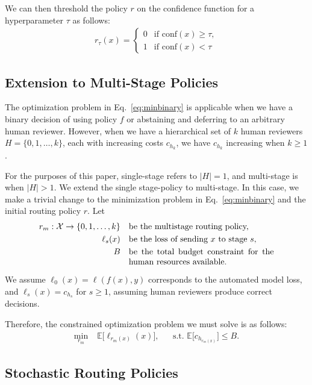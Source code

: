 \documentclass[conference]{IEEEtran}
\begin{document}
We can then threshold the policy $r$ on the confidence function for a hyperparameter 
$\tau$ as follows:
\begin{align}
r_\tau(x) =
\begin{cases} 
0 & \text{if } \mathrm{conf}(x) \geq \tau, \\
1 & \text{if } \mathrm{conf}(x) < \tau
\end{cases}
\end{align}

\subsection{Extension to Multi-Stage Policies}

The optimization problem in Eq.~\eqref{eq:minbinary} is applicable when we have a binary decision of
using policy $f$ or abstaining and deferring to an arbitrary human reviewer. However, when we have a 
hierarchical set of $k$ human reviewers $H = \{0,1, \dots ,k\}$, each with increasing costs $c_{h_k}$, we have
$c_{h_k}$ increasing when $k \geq 1$.

For the purposes of this paper, single-stage refers to $|H| = 1$, and multi-stage is when $|H| > 1$. 
We extend the single stage-policy to multi-stage. In this case, we make a trivial change to the 
minimization problem in Eq.~\eqref{eq:minbinary} and the initial routing policy $r$.
Let 
\begin{align}
r_{m}: \mathcal{X} \rightarrow \{0, 1, \dots, k\} && \parbox[t]{0.5\linewidth}{be the multistage routing policy,} \\
\ell_s(x) && \parbox[t]{0.5\linewidth}{be the loss of sending $x$ to stage $s$,} \\
B && \parbox[t]{0.5\linewidth}{be the total budget constraint for the human resources available.}
\end{align}

We assume $\ell_0(x) = \ell(f(x), y)$ corresponds to the automated model loss, and 
$\ell_s(x) = c_{h_s}$ for $s \geq 1$, assuming human reviewers produce correct decisions.

Therefore, the constrained optimization problem we must solve is as follows:
\begin{align}
\label{eq:minmulti}
\min_{r_m} \;& \mathbb{E} \big[ \ell_{r_m(x)}(x)], &&
\text{s.t. } \mathbb{E} \big[c_{h_{r_m(x)}}] \leq B. 
\end{align}

\subsection{Stochastic Routing Policies}
\end{document}

